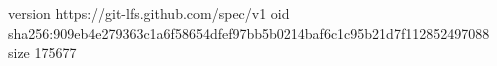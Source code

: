 version https://git-lfs.github.com/spec/v1
oid sha256:909eb4e279363c1a6f58654dfef97bb5b0214baf6c1c95b21d7f112852497088
size 175677
